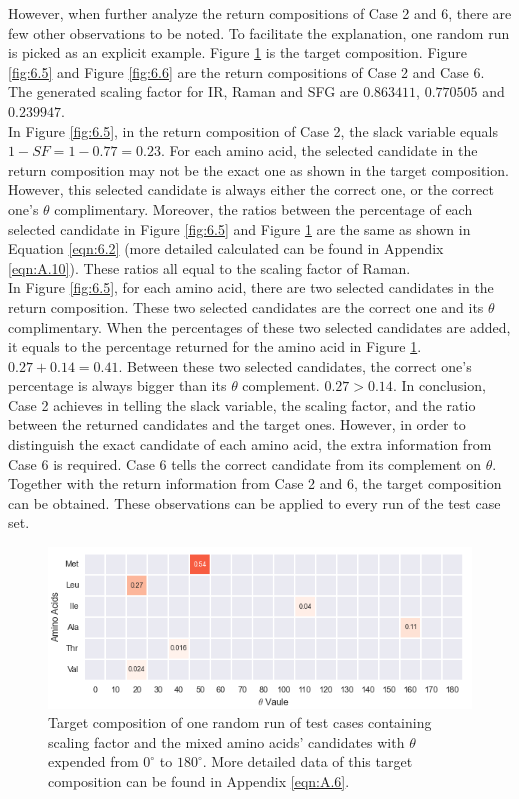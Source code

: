 However, when further analyze the return compositions of Case 2 and 6, there are few other observations to be noted. To facilitate the explanation, one random run is picked as an explicit example. Figure \ref{fig:6.4} is the target composition. Figure \ref{fig:6.5} and Figure \ref{fig:6.6} are the return compositions of Case 2 and Case 6. The generated scaling factor for IR, Raman and SFG are $0.863411$, $0.770505$ and $0.239947$. \\

In Figure \ref{fig:6.5}, in the return composition of Case 2, the slack variable equals $1-SF = 1-0.77 = 0.23$. For each amino acid, the selected candidate in the return composition may not be the exact one as shown in the target composition. However, this selected candidate is always either the correct one, or the correct one's $\theta$ complimentary. Moreover, the ratios between the percentage of each selected candidate in Figure \ref{fig:6.5} and Figure \ref{fig:6.4} are the same as shown in Equation \ref{eqn:6.2} (more detailed calculated can be found in Appendix \ref{eqn:A.10}). These ratios all equal to the scaling factor of Raman. \\

In Figure \ref{fig:6.5}, for each amino acid, there are two selected candidates in the return composition. These two selected candidates are the correct one and its $\theta$ complimentary. When the percentages of these two selected candidates are added, it equals to the percentage returned for the amino acid in Figure \ref{fig:6.4}. $0.27 + 0.14 = 0.41$. Between these two selected candidates, the correct one's percentage is always bigger than its $\theta$ complement. $0.27 > 0.14$. In conclusion, Case 2 achieves in telling the slack variable, the scaling factor, and the ratio between the returned candidates and the target ones. However, in order to distinguish the exact candidate of each amino acid, the extra information from Case 6 is required. Case 6 tells the correct candidate from its complement on $\theta$. Together with the return information from Case 2 and 6, the target composition can be obtained. These observations can be applied to every run of the test case set.\\


\begin{figure}[!ht] 
\centering
\includegraphics[scale=0.9]{Figures/chapter6_figure_five.png}
\caption{Target composition of one random run of test cases containing scaling factor and the mixed amino acids' candidates with $\theta$ expended from $0^{\circ}$ to $180^{\circ}$. More detailed data of this target composition can be found in Appendix \ref{eqn:A.6}.} \label{fig:6.4}
\end{figure}

